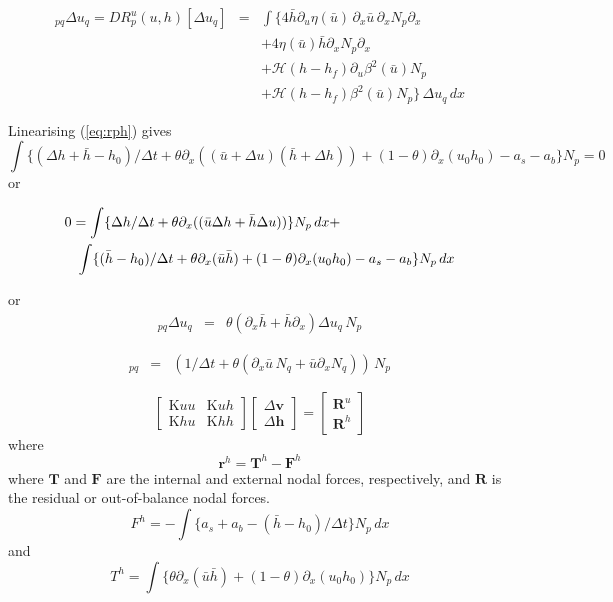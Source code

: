 \documentclass[10pt,a4paper]{book}
\newcommand{\He}{\mathcal{H}}
\newcommand{\p}{\partial}
\begin{document}
\begin{eqnarray}
[\mathrm{K}{uu}]_{pq} \Delta u_q=D R^u_p(u,h) [\Delta u_q]&=&\int \{ 4 \bar{h} \p_{u} \eta(\bar{u})\, \p_x \bar{u} \,
\p_x N_p  \p_x\nonumber \\
& & + 4 \eta(\bar{u}) \bar{h} \p_x N_p \p_x \nonumber \\
& & + \He(h-h_f) \p_u \beta^2(\bar{u}) N_p \nonumber \\
& & + \He(h-h_f) \beta^2(\bar{u}) N_p  \} \, \Delta u_q \, dx \nonumber
\end{eqnarray}

Linearising (\ref{eq:rph}) gives
\begin{equation}
\int \{ (\Delta h + \bar{h}-h_0) /\Delta t
+ \theta \p_x ( (\bar{u} + \Delta u) ( \bar{h}+\Delta h)) \nonumber 
+ (1-\theta) \p_x (u_0 h_0) - a_s - a_b \} N_p =0
\end{equation}
or

\begin{eqnarray}
\lefteqn{ 0=\int \{ \Delta h /\Delta t + \theta \p_x ( (\bar{u} \Delta h + \bar{h} \Delta u) ) \} N_p
\, dx+}\\
& &\int \{ (\bar{h}-h_0) /\Delta t
+ \theta \p_x ( \bar{u} \bar{h}) \nonumber 
+ (1-\theta) \p_x (u_0 h_0) - a_s -a_b\} N_p \, dx
\end{eqnarray}


or
\begin{eqnarray} 
[\mathrm{K}{hu}]_{pq} \Delta u_q &=& \theta (\p_x \bar{h}  + \bar{h} \p_x ) \Delta u_q \, N_p \nonumber 
\end{eqnarray}

\begin{eqnarray} 
[\mathrm{K}{hh}]_{pq} &=& (1/\Delta t + \theta (\p_x \bar{u}  \, N_q+ \bar{u} \p_x N_q)) \, N_p
\nonumber 
\end{eqnarray}




\begin{equation}
\left [ \begin{array}{cc}
      \mathrm{K}{uu} & \mathrm{K}{uh} \\
        \mathrm{K}{hu} & \mathrm{K}{hh} 
\end{array} \right ]
\left [ \begin{array}{c}
       \Delta \bm{v} \\
       \Delta \bm{h} 
\end{array} \right ]
=\left [ \begin{array}{c} \bm{R}^u \\ \bm{R}^h \end{array} \right ]
\end{equation}
where
\[
\bm{r}^h=\bm{T}^h-\bm{F}^h
\]
where $\bm{T}$ and $\bm{F}$ are the internal and external nodal forces, respectively, and
$\bm{R}$ is the residual or out-of-balance nodal forces.
\[
F^h=- \int \{ a_s + a_b - (\bar{h}-h_0) /\Delta t \} N_p \, dx
\]
and
\[
T^h= \int \{
 \theta \p_x ( \bar{u} \bar{h})  + (1-\theta) \p_x (u_0 h_0) \} N_p \, dx
\]
\end{document}

